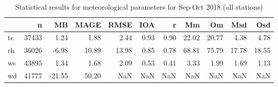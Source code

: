 \begin{table}
\centering
\caption{Statistical results for meteorological parameters for Sep-Oct 2018 (all stations)}
\label{tab:stats_all}
\begin{tabular}{lrrrrrrrrrr}
\toprule
{} &      n &     MB &   MAGE &   RMSE &   IOA &     r &     Mm &     Om &    Msd &    Osd \\
\midrule
tc &  37433 &   1.24 &   1.88 &   2.44 &  0.93 &  0.90 &  22.02 &  20.77 &   4.38 &   4.78 \\
rh &  36026 &  -6.98 &  10.89 &  13.98 &  0.85 &  0.78 &  68.81 &  75.79 &  17.78 &  18.55 \\
ws &  43895 &   1.34 &   1.68 &   2.09 &  0.53 &  0.41 &   3.33 &   1.99 &   1.69 &   1.13 \\
wd &  41777 & -21.55 &  50.20 &    NaN &   NaN &   NaN &    NaN &    NaN &    NaN &    NaN \\
\bottomrule
\end{tabular}
\end{table}

